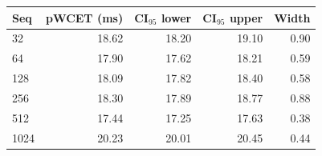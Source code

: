 \begin{tabular}{lrrrr}
\toprule
Seq & pWCET (ms) & CI$_{95}$ lower & CI$_{95}$ upper & Width \\
\midrule
  32 & 18.62 & 18.20 & 19.10 & 0.90 \\
  64 & 17.90 & 17.62 & 18.21 & 0.59 \\
  128 & 18.09 & 17.82 & 18.40 & 0.58 \\
  256 & 18.30 & 17.89 & 18.77 & 0.88 \\
  512 & 17.44 & 17.25 & 17.63 & 0.38 \\
  1024 & 20.23 & 20.01 & 20.45 & 0.44 \\
\bottomrule
\end{tabular}
